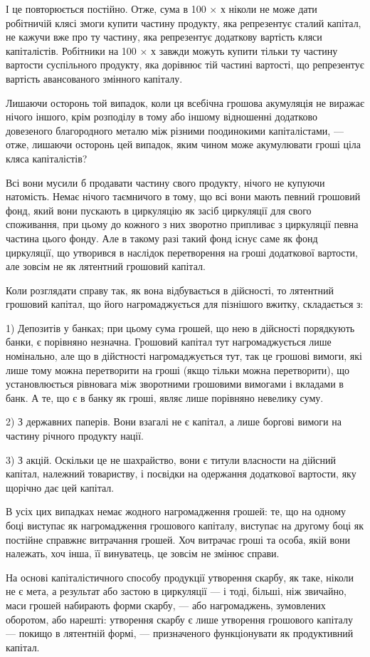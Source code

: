 \parcont{}  %
І це повторюється постійно. Отже, сума в 100 × х ніколи не
може дати робітничій клясі змоги купити частину продукту, яка репрезентує
сталий капітал, не кажучи вже про ту частину, яка репрезентує додаткову
вартість кляси капіталістів. Робітники на 100 × х завжди можуть
купити тільки ту частину вартости суспільного продукту, яка дорівнює
тій частині вартості, що репрезентує вартість авансованого змінного
капіталу.

Лишаючи осторонь той випадок, коли ця всебічна грошова акумуляція
не виражає нічого іншого, крім розподілу в тому або іншому відношенні
додатково довезеного благородного металю між різними поодинокими
капіталістами, — отже, лишаючи осторонь цей випадок, яким чином може
акумулювати гроші ціла кляса капіталістів?

Всі вони мусили б продавати частину свого продукту, нічого не купуючи
натомість. Немає нічого таємничого в тому, що всі вони мають
певний грошовий фонд, який вони пускають в циркуляцію як засіб циркуляції
для свого споживання, при цьому до кожного з них зворотно припливає
з циркуляції певна частина цього фонду. Але в такому разі такий фонд
існує саме як фонд циркуляції, що утворився в наслідок перетворення
на гроші додаткової вартости, але зовсім не як лятентний грошовий
капітал.

Коли розглядати справу так, як вона відбувається в дійсності, то лятентний
грошовий капітал, що його нагромаджується для пізнішого вжитку,
складається з:

1) Депозитів у банках; при цьому сума грошей, що нею в дійсності
порядкують банки, є порівняно незначна. Грошовий капітал тут нагромаджується
лише номінально, але що в дійстності нагромаджується тут,
так це грошові вимоги, які лише тому можна перетворити на гроші
(якщо тільки можна перетворити), що установлюється рівновага між
зворотними грошовими вимогами і вкладами в банк. А те, що є в банку
як гроші, являє лише порівняно невелику суму.

2) З державних паперів. Вони взагалі не є капітал, а лише боргові
вимоги на частину річного продукту нації.

3) З акцій. Оскільки це не шахрайство, вони є титули власности на
дійсний капітал, належний товариству, і посвідки на одержання додаткової
вартости, яку щорічно дає цей капітал.

В усіх цих випадках немає жодного нагромадження грошей: те, що
на одному боці виступає як нагромадження грошового капіталу, виступає
на другому боці як постійне справжнє витрачання грошей. Хоч витрачає
гроші та особа, якій вони належать, хоч інша, її винуватець, це зовсім
не змінює справи.

На основі капіталістичного способу продукції утворення скарбу, як
таке, ніколи не є мета, а результат або застою в циркуляції — і тоді,
більші, ніж звичайно, маси грошей набирають форми скарбу, — або нагромаджень,
зумовлених оборотом, або нарешті: утворення скарбу є лише
утворення грошового капіталу — покищо в лятентній формі, — призначеного
функціонувати як продуктивний капітал.
